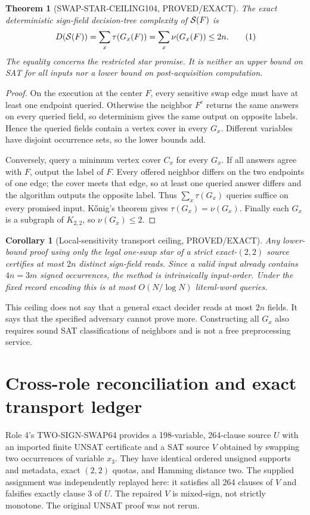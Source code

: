 \documentclass[11pt]{article}
\newtheorem{theorem}{Theorem}
\newtheorem{corollary}{Corollary}
\begin{document}
\begin{theorem}[SWAP-STAR-CEILING104, PROVED/EXACT]
The exact deterministic sign-field decision-tree complexity of
${\cal S}(F)$ is
\[
 D({\cal S}(F))
 =\sum_x\tau(G_x(F))
 =\sum_x\nu(G_x(F))
 \le 2n.
\tag{1}
\]
The equality concerns the restricted star promise. It is neither an upper
bound on SAT for all inputs nor a lower bound on post-acquisition computation.
\end{theorem}
\begin{proof}
On the execution at the center $F$, every sensitive swap edge must have at
least one endpoint queried. Otherwise the neighbor $F^e$ returns the same
answers on every queried field, so determinism gives the same output on
opposite labels. Hence the queried fields contain a vertex cover in every
$G_x$. Different variables have disjoint occurrence sets, so the lower
bounds add.

Conversely, query a minimum vertex cover $C_x$ for every $G_x$. If all
answers agree with $F$, output the label of $F$. Every offered neighbor
differs on the two endpoints of one edge; the cover meets that edge, so at
least one queried answer differs and the algorithm outputs the opposite
label. Thus $\sum_x\tau(G_x)$ queries suffice on every promised input.
K\H{o}nig's theorem gives $\tau(G_x)=\nu(G_x)$. Finally each $G_x$ is a
subgraph of $K_{2,2}$, so $\nu(G_x)\le2$.
\end{proof}

\begin{corollary}[Local-sensitivity transport ceiling, PROVED/EXACT]
Any lower-bound proof using only the legal one-swap star of a strict
exact-$(2,2)$ source certifies at most $2n$ distinct sign-field reads.
Since a valid input already contains $4n=3m$ signed occurrences, the method
is intrinsically input-order. Under the fixed record encoding this is at
most $O(N/\log N)$ literal-word queries.
\end{corollary}
This ceiling does not say that a general exact decider reads at most $2n$
fields. It says that the specified adversary cannot prove more. Constructing
all $G_x$ also requires sound SAT classifications of neighbors and is not a
free preprocessing service.

\section{Cross-role reconciliation and exact transport ledger}
Role 4's TWO-SIGN-SWAP64 provides a 198-variable, 264-clause source $U$ with
an imported finite UNSAT certificate and a SAT source $V$ obtained by swapping
two occurrences of variable $x_3$. They have identical ordered unsigned
supports and metadata, exact $(2,2)$ quotas, and Hamming distance two. The
supplied assignment was independently replayed here: it satisfies all
264 clauses of $V$ and falsifies exactly clause 3 of $U$. The repaired
$V$ is mixed-sign, not strictly monotone. The original UNSAT proof was not
rerun.
\end{document}
